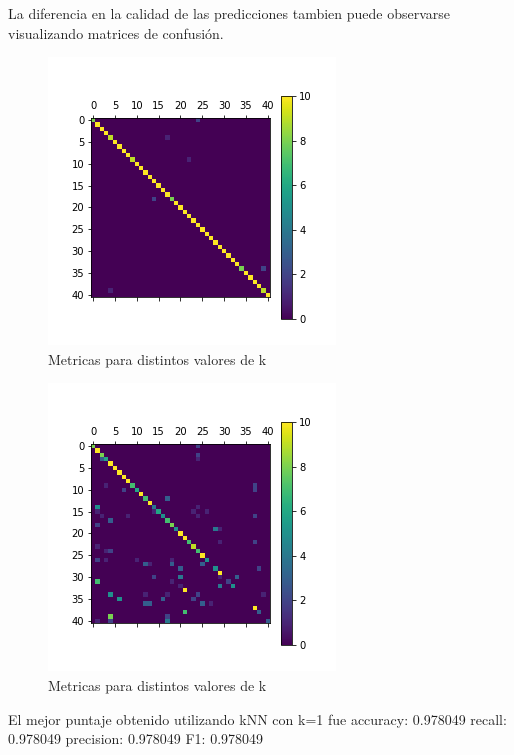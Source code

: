 La diferencia en la calidad de las predicciones tambien puede observarse  visualizando matrices de confusión.
 
\begin{figure}[H]
    \begin{center}
      \includegraphics[width=0.6\columnwidth]{imagenes/charuli-des/Confusion_matrix_for_k_1.png}
      \caption{Metricas para distintos valores de k}
    \end{center}
\end{figure}
 
\begin{figure}[H]
    \begin{center}
      \includegraphics[width=0.6\columnwidth]{imagenes/charuli-des/Confusion_matrix_for_k_25.png}
      \caption{Metricas para distintos valores de k}
    \end{center}
\end{figure}
 
El mejor puntaje obtenido utilizando kNN con k=1 fue accuracy: 0.978049  recall: 0.978049  precision: 0.978049  F1: 0.978049
 
